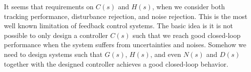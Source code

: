 \documentclass[twoside]{article}
\begin{document}
  It seems that requirements on $C(s)$ and $H(s)$, when we consider both tracking performance, 
  disturbance rejection, and noise rejection. This is the most well known limitation of feedback 
  control systems. The basic idea is it is not possible to only design a controller $C(s)$ such that 
  we reach good closed-loop performance when the system suffers from uncertainties and noises.
  Somehow we need to design systems such that $G(s)$, $H(s)$, and even $N(s)$ and $D(s)$
  together with the designed controller achieves a good closed-loop behavior. 
  
  
\end{document}
